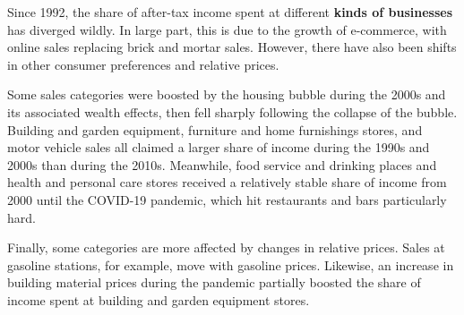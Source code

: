 \begin{minipage}{0.76\textwidth}
\vspace{3mm}

\small 
\vspace{0.5mm}

\vspace{4.0cm}

\hspace{5mm} 

\end{minipage}
\newpage
\begin{minipage}{0.76\textwidth}  
\small Since 1992, the share of after-tax income spent at different \textbf{kinds of businesses} has diverged wildly. In large part, this is due to the growth of e-commerce, with online sales replacing brick and mortar sales. However, there have also been shifts in other consumer preferences and relative prices. 

 

Some sales categories were boosted by the housing bubble during the 2000s and its associated wealth effects, then fell sharply following the collapse of the bubble. Building and garden equipment, furniture and home furnishings stores, and motor vehicle sales all claimed a larger share of income during the 1990s and 2000s than during the 2010s. Meanwhile, food service and drinking places and health and personal care stores received a relatively stable share of income from 2000 until the COVID-19 pandemic, which hit restaurants and bars particularly hard. 

Finally, some categories are more affected by changes in relative prices. Sales at gasoline stations, for example, move with gasoline prices. Likewise, an increase in building material prices during the pandemic partially boosted the share of income spent at building and garden equipment stores. 
\end{minipage}
\vspace{1.5mm}

